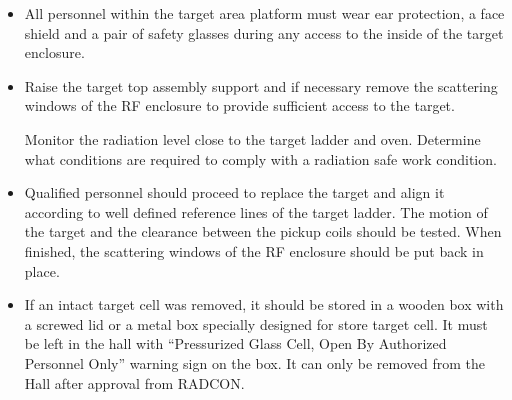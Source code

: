 {\begin{itemize}
\item 
\begin{safetyen}{10}{5}
All personnel within the target area platform must wear ear
protection, a face shield and a pair of safety glasses 
during any access to the inside of the target enclosure.
\end{safetyen}
\item  
Raise the target top assembly support and if necessary remove the
scattering windows of the RF enclosure to provide sufficient
access to the target.  
\begin{safetyen}{10}{5}
Monitor the radiation level close to the target
ladder and oven.  Determine what conditions are required to comply
with a radiation safe work condition.
\end{safetyen}

\item 
Qualified personnel should proceed to replace the target and align it
according to well defined reference lines of the target ladder. The
motion of the target and the clearance between the pickup
coils should be tested. When finished, the scattering windows of
the RF enclosure should be put back in place. 

\item 
\begin{safetyen}{10}{5}
If an intact target cell was removed, it should be stored in a wooden
box with a screwed lid or a metal box specially designed for store
target cell. It must be left in the hall with 
``Pressurized Glass Cell, Open By Authorized Personnel Only'' warning sign 
on the box. It can only be
removed from the Hall after approval from RADCON.
\end{safetyen}

\end{itemize}

} %
